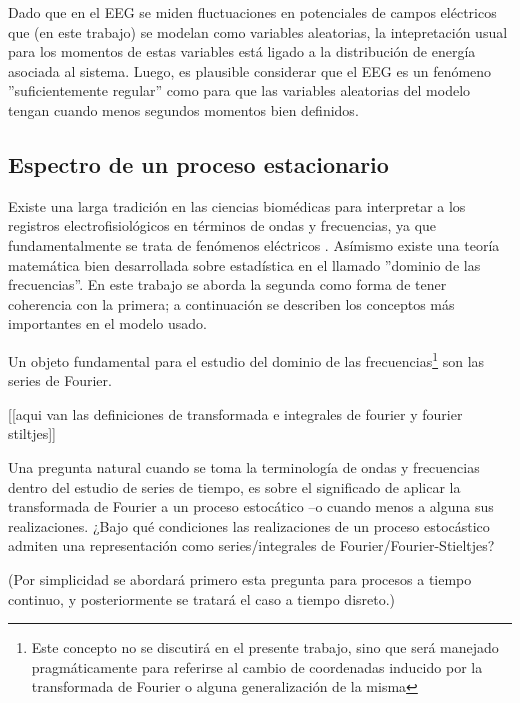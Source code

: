 Dado que en el EEG se miden fluctuaciones en potenciales de campos el\'ectricos
que (en este trabajo) se modelan como variables aleatorias, 
la intepretaci\'on usual para los momentos de estas variables est\'a ligado a la distribuci\'on de
energ\'ia asociada al sistema. Luego, es plausible considerar que el EEG es un fen\'omeno
''suficientemente regular'' como para que las variables aleatorias del modelo tengan cuando
menos segundos momentos bien definidos.


\subsection{Espectro de un proceso estacionario}

Existe una larga tradici\'on en las ciencias biom\'edicas para interpretar a los registros
electrofisiol\'ogicos en t\'erminos de ondas y frecuencias, ya que fundamentalmente se
trata de fen\'omenos el\'ectricos \cite{Kaiser00}. 
As\'imismo existe una teor\'ia matem\'atica bien desarrollada sobre estad\'istica en el 
llamado ''dominio de las frecuencias''. 
En este trabajo se aborda la segunda como forma de tener coherencia con la primera; a continuaci\'on
se describen los conceptos m\'as importantes en el modelo usado.

Un objeto fundamental para el estudio del dominio de las frecuencias\footnote{Este concepto no se
discutir\'a en el presente trabajo, sino que ser\'a manejado pragm\'aticamente para referirse
al cambio de coordenadas inducido por la transformada de Fourier o alguna generalizaci\'on de la 
misma} son las series de Fourier. 


[[aqui van las definiciones de transformada e integrales de fourier y fourier stiltjes]]


Una pregunta natural cuando se toma la terminolog\'ia de ondas y frecuencias dentro
del estudio de series de tiempo, es sobre el significado de aplicar la transformada de Fourier a
un proceso estoc\'atico --o cuando menos a alguna sus realizaciones.
¿Bajo qu\'e condiciones las realizaciones de un proceso estoc\'astico admiten una representaci\'on
como series/integrales de Fourier/Fourier-Stieltjes?

(Por simplicidad se abordar\'a primero esta pregunta para procesos a tiempo continuo, y 
posteriormente se tratar\'a el caso a tiempo disreto.)


